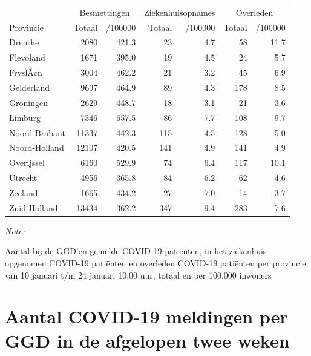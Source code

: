 \documentclass[
  english,
  man,floatsintext]{apa6}
\begin{document}
\begin{table}[H]
\centering
\begin{threeparttable}
\begin{tabular}{lrrrrrr}
\toprule
\multicolumn{1}{c}{ } & \multicolumn{2}{c}{Besmettingen} & \multicolumn{2}{c}{Ziekenhuisopnames} & \multicolumn{2}{c}{Overleden} \\
\cmidrule(l{3pt}r{3pt}){2-3} \cmidrule(l{3pt}r{3pt}){4-5} \cmidrule(l{3pt}r{3pt}){6-7}
Provincie & Totaal & /100000 & Totaal & /100000 & Totaal & /100000\\
\midrule
Drenthe & 2080 & 421.3 & 23 & 4.7 & 58 & 11.7\\
Flevoland & 1671 & 395.0 & 19 & 4.5 & 24 & 5.7\\
FryslÃ¢n & 3004 & 462.2 & 21 & 3.2 & 45 & 6.9\\
Gelderland & 9697 & 464.9 & 89 & 4.3 & 178 & 8.5\\
Groningen & 2629 & 448.7 & 18 & 3.1 & 21 & 3.6\\
Limburg & 7346 & 657.5 & 86 & 7.7 & 108 & 9.7\\
Noord-Brabant & 11337 & 442.3 & 115 & 4.5 & 128 & 5.0\\
Noord-Holland & 12107 & 420.5 & 141 & 4.9 & 141 & 4.9\\
Overijssel & 6160 & 529.9 & 74 & 6.4 & 117 & 10.1\\
Utrecht & 4956 & 365.8 & 84 & 6.2 & 62 & 4.6\\
Zeeland & 1665 & 434.2 & 27 & 7.0 & 14 & 3.7\\
Zuid-Holland & 13434 & 362.2 & 347 & 9.4 & 283 & 7.6\\
\bottomrule
\end{tabular}
\begin{tablenotes}
\item \textit{Note: } 
\item Aantal bij de GGD’en gemelde COVID-19 patiënten, in het ziekenhuis opgenomen COVID-19 patiënten en overleden COVID-19 patiënten per provincie van 10 januari t/m 24 januari 10:00 uur, totaal en per 100.000 inwoners
\end{tablenotes}
\end{threeparttable}
\end{table}

\newpage

\hypertarget{aantal-covid-19-meldingen-per-ggd-in-de-afgelopen-twee-weken}{%
\section{Aantal COVID-19 meldingen per GGD in de afgelopen twee weken}\label{aantal-covid-19-meldingen-per-ggd-in-de-afgelopen-twee-weken}}
\end{document}
